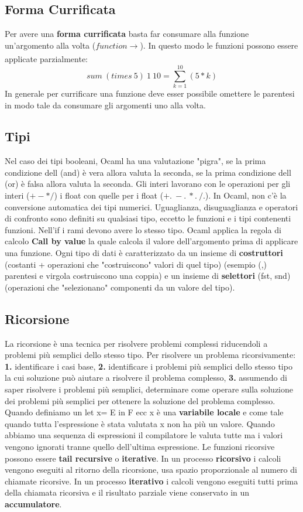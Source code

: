 \documentclass{article}
\numberwithin{equation}{subsection}
\begin{document}
\subsection{Forma Currificata}
Per avere una \textbf{forma currificata} basta far consumare alla funzione un'argomento alla volta (\textbf{$function\xrightarrow[]{}$}). In questo modo le funzioni possono essere applicate parzialmente:
$$sum \ (times \ 5) \ 1 \ 10= \sum_{k=1}^{10} (5*k)
$$
In generale per currificare una funzione deve esser possibile omettere le parentesi in modo tale da consumare gli argomenti uno alla volta.
\subsection{Tipi}
Nel caso dei tipi booleani, Ocaml ha una valutazione "pigra", se la prima condizione dell (and) è vera allora valuta la seconda, se la prima condizione dell (or) è falsa allora valuta la seconda. Gli interi lavorano con le operazioni per gli interi ($+-*/$) i float con quelle per i float ($+. \ -. \ *. \ /.$). In Ocaml, non c'è la conversione automatica dei tipi numerici. Uguaglianza, disuguaglianza e operatori di confronto sono definiti su qualsiasi tipo, eccetto le funzioni e i tipi contenenti funzioni. Nell'if i rami devono avere lo stesso tipo. Ocaml applica la regola di calcolo \textbf{Call by value} la quale calcola il valore dell'argomento prima di applicare una funzione. Ogni tipo di dati è caratterizzato da un insieme di \textbf{costruttori} (costanti + operazioni che "costruiscono" valori di quel tipo) (esempio (,) parentesi e virgola costruiscono una coppia) e un insieme di \textbf{selettori} (fst, snd) (operazioni che "selezionano" componenti da un valore del tipo).
\subsection{Ricorsione}
La ricorsione è una tecnica per risolvere problemi complessi riducendoli a problemi più semplici dello stesso tipo. Per risolvere un problema ricorsivamente: \textbf{1.} identificare i casi base, \textbf{2.} identificare i problemi più semplici dello stesso tipo la cui soluzione può aiutare a risolvere il problema complesso, \textbf{3.} assumendo di saper risolvere i problemi più semplici, determinare come operare sulla soluzione dei problemi più semplici per ottenere la soluzione del problema complesso. Quando definiamo un let x= E in F ecc x è una \textbf{variabile locale} e come tale quando tutta l'espressione è stata valutata x non ha più un valore. Quando abbiamo una sequenza di espressioni il compilatore le valuta tutte ma i valori vengono ignorati tranne quello dell'ultima espressione. Le funzioni ricorsive possono essere \textbf{tail recursive} o \textbf{iterative}. In un processo \textbf{ricorsivo} i calcoli vengono eseguiti al ritorno della ricorsione, usa spazio proporzionale al numero di chiamate ricorsive. In un processo \textbf{iterativo} i calcoli vengono eseguiti tutti prima della chiamata ricorsiva e il risultato parziale viene conservato in un \textbf{accumulatore}.
\end{document}
